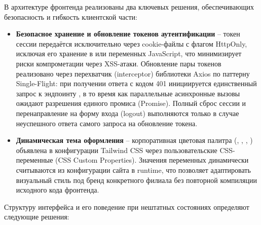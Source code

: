 В архитектуре фронтенда реализованы два ключевых решения, обеспечивающих
безопасность и гибкость клиентской части:

\begin{itemize}
  \item \textbf{Безопасное хранение и обновление токенов аутентификации}
        -- токен сессии передаётся исключительно через cookie-файлы с
        флагом HttpOnly, исключая его хранение в  или
        переменных JavaScript, что минимизирует риски компрометации через
        XSS-атаки. Обновление пары токенов реализовано через перехватчик
        (interceptor) библиотеки Axios по паттерну Single-Flight: при
        получении ответа с кодом 401 инициируется единственный запрос к
        эндпоинту , в то время как параллельные
        асинхронные вызовы ожидают разрешения единого промиса (Promise).
        Полный сброс сессии и перенаправление на форму входа (logout)
        выполняются только в случае неуспешного ответа самого запроса на
        обновление токена.
  \item \textbf{Динамическая тема оформления} -- корпоративная цветовая
        палитра (, , ,
        ) объявлена в конфигурации Tailwind CSS через
        пользовательские CSS-переменные (CSS Custom Properties). Значения
        переменных динамически считываются из конфигурации сайта в
        runtime, что позволяет адаптировать визуальный стиль под бренд
        конкретного филиала без повторной компиляции исходного кода
        фронтенда.
\end{itemize}

Структуру интерфейса и его поведение при нештатных состояниях определяют
следующие решения:

